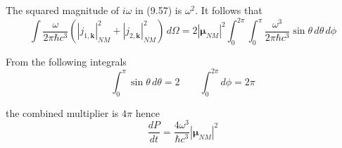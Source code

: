 The squared magnitude of $i\omega$ in (9.57) is $\omega^2$.
It follows that
\begin{equation*}
\int\frac{\omega}{2\pi\hbar c^3}
\left(\left|j_{1,\mathbf k}\right|_{NM}^2+\left|j_{2,\mathbf k}\right|_{NM}^2\right)
\,d\Omega
=2\left|\boldsymbol\mu_{NM}\right|^2
\int_0^{2\pi}\int_0^\pi
\frac{\omega^3}{2\pi\hbar c^3}
\sin\theta
\,d\theta\,d\phi
\end{equation*}

From the following integrals
\begin{equation*}
\int_0^\pi\sin\theta\,d\theta=2
\qquad
\int_0^{2\pi}d\phi=2\pi
\end{equation*}

the combined multiplier is $4\pi$ hence
\begin{equation*}
\frac{dP}{dt}
=\frac{4\omega^3}{\hbar c^3}
\left|\boldsymbol\mu_{NM}\right|^2
\end{equation*}


